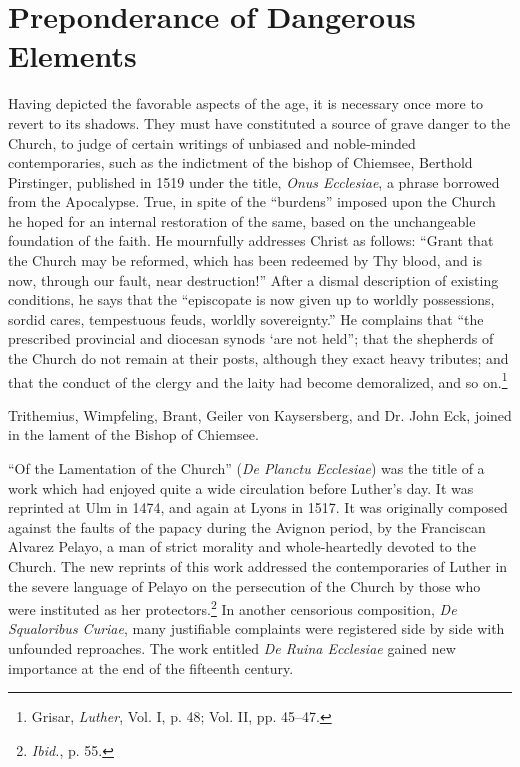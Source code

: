 \section{Preponderance of Dangerous Elements}

Having depicted the favorable aspects of the age, it is necessary
once more to revert to its shadows. They must have constituted a
source of grave danger to the Church, to judge of certain writings
of unbiased and noble-minded contemporaries, such as the indictment of
the bishop of Chiemsee, Berthold Pirstinger, published in
1519 under the title, \textit{Onus Ecclesiae}, a phrase borrowed from the
Apocalypse. True, in spite of the “burdens” imposed upon the Church
he hoped for an internal restoration of the same, based on the unchangeable
foundation of the faith. He mournfully addresses Christ
as follows: “Grant that the Church may be reformed, which has
been redeemed by Thy blood, and is now, through our fault, near
destruction!” After a dismal description of existing conditions, he
says that the “episcopate is now given up to worldly possessions,
sordid cares, tempestuous feuds, worldly sovereignty.” He complains
that “the prescribed provincial and diocesan synods ‘are not held”;
that the shepherds of the Church do not remain at their posts, although
they exact heavy tributes; and that the conduct of the clergy
and the laity had become demoralized, and so on.\footnote
{Grisar, \textit{Luther}, Vol. I, p. 48; Vol. II, pp. 45--47.}

Trithemius, Wimpfeling, Brant, Geiler von Kaysersberg, and Dr.
John Eck, joined in the lament of the Bishop of Chiemsee.

“Of the Lamentation of the Church” (\textit{De Planctu Ecclesiae})
was the title of a work which had enjoyed quite a wide circulation
before Luther’s day. It was reprinted at Ulm in 1474, and again at
Lyons in 1517. It was originally composed against the faults of
the papacy during the Avignon period, by the Franciscan Alvarez
Pelayo, a man of strict morality and whole-heartedly devoted to the
Church. The new reprints of this work addressed the contemporaries
of Luther in the severe language of Pelayo on the persecution of
the Church by those who were instituted as her protectors.\footnote{\textit{Ibid.}, p. 55.}
In another censorious composition, \textit{De Squaloribus Curiae}, many justifiable
complaints were registered side by side with unfounded reproaches. The
work entitled \textit{De Ruina Ecclesiae} gained new importance
at the end of the fifteenth century.

